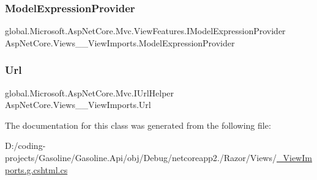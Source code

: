 \mbox{\label{class_asp_net_core_1_1_views_____view_imports_af24a853448780518b9b8bb0494fc03d0}} 
\subsubsection{\texorpdfstring{ModelExpressionProvider}{ModelExpressionProvider}}
{\footnotesize\ttfamily global.\+Microsoft.\+Asp\+Net\+Core.\+Mvc.\+View\+Features.\+I\+Model\+Expression\+Provider Asp\+Net\+Core.\+Views\+\_\+\+\_\+\+View\+Imports.\+Model\+Expression\+Provider\hspace{0.3cm}{\ttfamily [get]}}

\mbox{\label{class_asp_net_core_1_1_views_____view_imports_af6e6f9f7d99285bd76a2db97f17a9128}} 
\subsubsection{\texorpdfstring{Url}{Url}}
{\footnotesize\ttfamily global.\+Microsoft.\+Asp\+Net\+Core.\+Mvc.\+I\+Url\+Helper Asp\+Net\+Core.\+Views\+\_\+\+\_\+\+View\+Imports.\+Url\hspace{0.3cm}{\ttfamily [get]}}



The documentation for this class was generated from the following file\+:\begin{DoxyCompactItemize}
\item 
D\+:/coding-\/projects/\+Gasoline/\+Gasoline.\+Api/obj/\+Debug/netcoreapp2./\+Razor/\+Views/\mbox{\hyperlink{___view_imports_8g_8cshtml_8cs}{\+\_\+\+View\+Imports.\+g.\+cshtml.\+cs}}\end{DoxyCompactItemize}
